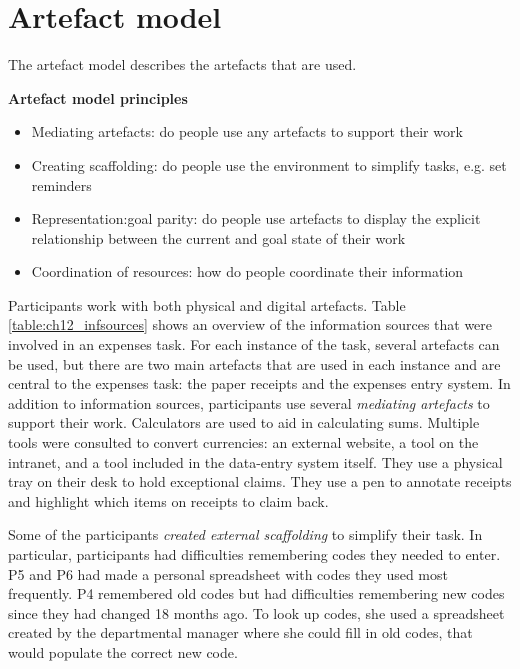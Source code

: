 \section{Artefact model}
The artefact model describes the artefacts that are used. 

\begin{framed}\noindent
\textbf{Artefact model principles}  \\
\begin{itemize}
\item Mediating artefacts: do people use any artefacts to support their work
\item Creating scaffolding: do people use the environment to simplify tasks, e.g. set reminders
\item Representation:goal parity: do people use artefacts to display the explicit relationship between the current and goal state of their work
\item Coordination of resources: how do people coordinate their information
\end{itemize}
\end{framed}


Participants work with both physical and digital artefacts. Table \ref{table:ch12_infsources} shows an overview of the information sources that were involved in an expenses task. For each instance of the task, several artefacts can be used, but there are two main artefacts that are used in each instance and are central to the expenses task: the paper receipts and the expenses entry system.
In addition to information sources, participants use several \textit{mediating artefacts} to support their work. Calculators are used to aid in calculating sums. Multiple tools were consulted to convert currencies: an external website, a tool on the intranet, and a tool included in the data-entry system itself. They use a physical tray on their desk to hold exceptional claims. They use a pen to annotate receipts and highlight which items on receipts to claim back.

Some of the participants \textit{created external scaffolding} to simplify their task. In particular, participants had difficulties remembering codes they needed to enter. P5 and P6 had made a personal spreadsheet with codes they used most frequently. P4 remembered old codes but had difficulties remembering new codes since they had changed 18 months ago. To look up codes, she used a spreadsheet created by the departmental manager where she could fill in old codes, that would populate the correct new code. 


